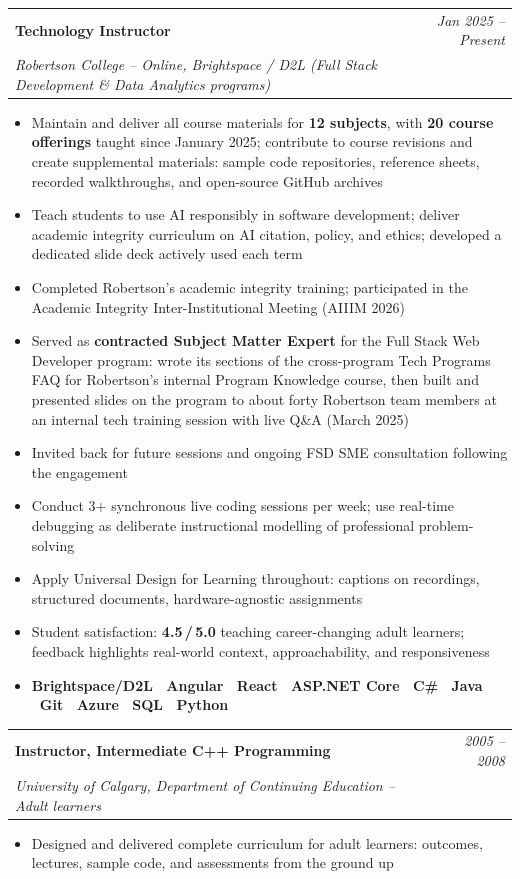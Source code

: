 \documentclass[10pt]{article}
\makeatletter
\newcommand{\tech}[1]{\textcolor{secondary}{\textbf{#1}}}
\newcommand{\experience}[4]{%
  \vspace{4pt}
  \begin{tabular*}{\textwidth}{@{}l@{\extracolsep{\fill}}r@{}}
    \textbf{#1} & \textit{#2} \\
    \textit{\small#3} & \textit{\small#4}
  \end{tabular*}
  \vspace{-4pt}
}
\makeatother
\begin{document}
\experience{Technology Instructor}{Jan 2025 -- Present}{Robertson College \normalfont\small\textit{-- Online, Brightspace / D2L (Full Stack Development \& Data Analytics programs)}}{}
\begin{itemize}
    \item Maintain and deliver all course materials for \textbf{12 subjects}, with \textbf{20 course offerings} taught since January 2025; contribute to course revisions and create supplemental materials: sample code repositories, reference sheets, recorded walkthroughs, and open-source GitHub archives
    \item Teach students to use AI responsibly in software development; deliver academic integrity curriculum on AI citation, policy, and ethics; developed a dedicated slide deck actively used each term
    \item Completed Robertson's academic integrity training; participated in the Academic Integrity Inter-Institutional Meeting (AIIIM 2026)
    \item Served as \textbf{contracted Subject Matter Expert} for the Full Stack Web Developer program: wrote its sections of the cross-program Tech Programs FAQ for Robertson's internal Program Knowledge course, then built and presented slides on the program to about forty Robertson team members at an internal tech training session with live Q\&A (March 2025)
    \item Invited back for future sessions and ongoing FSD SME consultation following the engagement
    \item Conduct 3+ synchronous live coding sessions per week; use real-time debugging as deliberate instructional modelling of professional problem-solving
    \item Apply Universal Design for Learning throughout: captions on recordings, structured documents, hardware-agnostic assignments
    \item Student satisfaction: \textbf{4.5\,/\,5.0} teaching career-changing adult learners; feedback highlights real-world context, approachability, and responsiveness
    \item[] \tech{Brightspace/D2L \textbullet\ Angular \textbullet\ React \textbullet\ ASP.NET Core \textbullet\ C\# \textbullet\ Java \textbullet\ Git \textbullet\ Azure \textbullet\ SQL \textbullet\ Python}
\end{itemize}

\experience{Instructor, Intermediate C++ Programming}{2005 -- 2008}{University of Calgary, Department of Continuing Education \normalfont\small\textit{-- Adult learners}}{}
\begin{itemize}
    \item Designed and delivered complete curriculum for adult learners: outcomes, lectures, sample code, and assessments from the ground up
\end{itemize}
\end{document}

